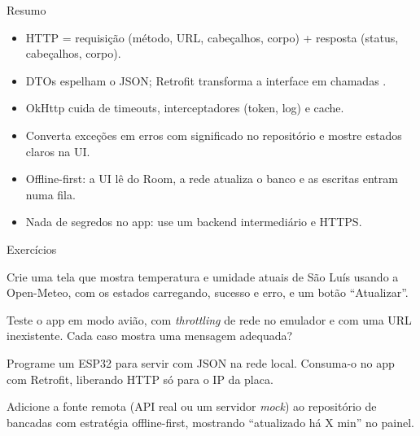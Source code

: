 \documentclass[aspectratio=169,10pt]{beamer}
\begin{document}
\begin{frame}{Resumo}
  \begin{resumo}
    \begin{itemize}
      \item HTTP = requisição (método, URL, cabeçalhos, corpo) + resposta (status, cabeçalhos, corpo).
      \item DTOs  espelham o JSON; Retrofit transforma a interface em chamadas .
      \item OkHttp cuida de timeouts, interceptadores (token, log) e cache.
      \item Converta exceções em erros com significado no repositório e mostre estados claros na UI.
      \item Offline-first: a UI lê do Room, a rede atualiza o banco e as escritas entram numa fila.
      \item Nada de segredos no app: use um backend intermediário e HTTPS.
    \end{itemize}
  \end{resumo}
\end{frame}

\begin{frame}{Exercícios}
  \begin{exercicio}
    Crie uma tela que mostra temperatura e umidade atuais de São Luís usando a Open-Meteo, com os estados carregando, sucesso e erro, e um botão ``Atualizar''.
  \end{exercicio}
  \begin{exercicio}
    Teste o app em modo avião, com \emph{throttling} de rede no emulador e com uma URL inexistente. Cada caso mostra uma mensagem adequada?
  \end{exercicio}
  \begin{exercicio}
    Programe um ESP32 para servir  com JSON na rede local. Consuma-o no app com Retrofit, liberando HTTP só para o IP da placa.
  \end{exercicio}
  \begin{projeto}
    Adicione a fonte remota (API real ou um servidor \emph{mock}) ao repositório de bancadas com estratégia offline-first, mostrando ``atualizado há X min'' no painel.
  \end{projeto}
\end{frame}
\end{document}
